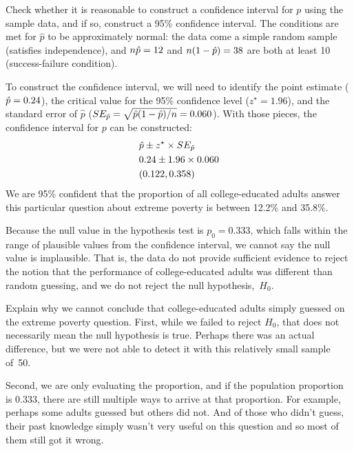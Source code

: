 \begin{examplewrap}
\begin{nexample}{Check whether it is reasonable to construct
    a confidence interval for $p$ using the sample data, and
    if so, construct a 95\% confidence interval.}
  The conditions are met for $\hat{p}$ to be approximately
  normal: the data come a simple random sample (satisfies
  independence), and $n\hat{p} = 12$ and
  $n(1 - \hat{p}) = 38$ are both
  at least 10 (success-failure condition).

  To construct the confidence interval, we will need to identify
  the point estimate ($\hat{p} = 0.24$), the critical value for
  the 95\% confidence level ($z^{\star} = 1.96$), and the standard
  error of $\hat{p}$
  ($SE_{\hat{p}} = \sqrt{\hat{p}(1 - \hat{p}) / n} = 0.060$).
  With those pieces, the confidence interval for $p$ can be
  constructed:
  \begin{align*}
    &\hat{p} \pm z^{\star} \times SE_{\hat{p}} \\
    &0.24 \pm 1.96 \times 0.060 \\
    &(0.122, 0.358)
  \end{align*}
  We are 95\% confident that the proportion of all
  college-educated adults answer this particular question
  about extreme poverty is between 12.2\%
  and 35.8\%.
\end{nexample}
\end{examplewrap}

Because the null value in the hypothesis test is $p_0 = 0.333$,
which falls within the range of plausible values from the
confidence interval, we cannot say the null value is implausible.
That is, the data do not provide sufficient evidence to reject
the notion that the performance of college-educated
adults was different than random guessing,
and we do not reject the null hypothesis,~$H_0$.

\begin{examplewrap}
\begin{nexample}{Explain why we cannot conclude that
    college-educated adults simply guessed on the extreme
    poverty question.}
  First, while we failed to reject $H_0$, that does not
  necessarily mean the null hypothesis is true.
  Perhaps there was an actual difference,
  but we were not able to detect it with this
  relatively small sample of~50.

  Second, we are only evaluating the proportion,
  and if the population proportion is 0.333,
  there are still multiple ways to arrive at that proportion.
  For example,
  perhaps some adults guessed but others did not.
  And of those who didn't guess,
  their past knowledge simply wasn't very useful on this
  question and so most of them still got it wrong.
\end{nexample}
\end{examplewrap}

